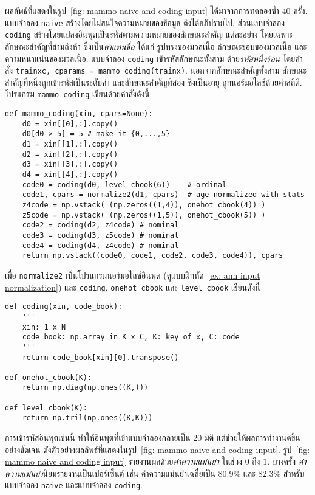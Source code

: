 \begin{Exercise}
ผลลัพธ์ที่แสดงในรูป~\ref{fig: mammo naive and coding input}
ได้มาจากการทดลองซ้ำ $40$ ครั้ง.
แบบจำลอง \verb|naive| สร้างโดยไม่สนใจความหมายของข้อมูล ดังได้อภิปรายไป.
ส่วนแบบจำลอง \verb|coding| สร้างโดยแปลงอินพุตเป็นรหัสตามความหมายของลักษณะสำคัญ
แต่ละอย่าง โดยเฉพาะลักษณะสำคัญที่สามถึงห้า ซึ่งเป็น\textit{ค่าแทนชื่อ}
ได้แก่ รูปทรงของมวลเนื้อ ลักษณะขอบของมวลเนื้อ และความหนาแน่นของมวลเนื้อ.
แบบจำลอง \verb|coding| เข้ารหัสลักษณะทั้งสาม ด้วย\textit{รหัสหนึ่งร้อน}
โดยคำสั่ง \verb|trainxc, cparams = mammo_coding(trainx)|.
นอกจากลักษณะสำคัญทั้งสาม
ลักษณะสำคัญที่หนึ่งถูกเข้ารหัสเป็นระดับค่า
และลักษณะสำคัญที่สอง ซึ่งเป็นอายุ
ถูกนอร์มอไลซ์ด้วยค่าสถิติ.
โปรแกรม \verb|mammo_coding| เขียนด้วยคำสั่งดังนี้
\begin{Verbatim}[fontsize=\small]
def mammo_coding(xin, cpars=None):
    d0 = xin[[0],:].copy()
    d0[d0 > 5] = 5 # make it {0,...,5}
    d1 = xin[[1],:].copy()
    d2 = xin[[2],:].copy()
    d3 = xin[[3],:].copy()
    d4 = xin[[4],:].copy()
    code0 = coding(d0, level_cbook(6))    # ordinal
    code1, cpars = normalize2(d1, cpars)  # age normalized with stats
    z4code = np.vstack( (np.zeros((1,4)), onehot_cbook(4)) )
    z5code = np.vstack( (np.zeros((1,5)), onehot_cbook(5)) )
    code2 = coding(d2, z4code) # nominal
    code3 = coding(d3, z5code) # nominal
    code4 = coding(d4, z4code) # nominal
    return np.vstack((code0, code1, code2, code3, code4)), cpars
\end{Verbatim}
เมื่อ \verb|normalize2| เป็นโปรแกรมนอร์มอไลซ์อินพุต (ดูแบบฝึกหัด~\ref{ex: ann input normalization})
และ \verb|coding|, \verb|onehot_cbook| และ \verb|level_cbook| เขียนดังนี้
\begin{Verbatim}[fontsize=\small]
def coding(xin, code_book):
    '''
    xin: 1 x N
    code_book: np.array in K x C, K: key of x, C: code
    '''
    return code_book[xin][0].transpose()
    
def onehot_cbook(K):
    return np.diag(np.ones((K,)))

def level_cbook(K):
    return np.tril(np.ones((K,K)))
\end{Verbatim}

การเข้ารหัสอินพุตเช่นนี้ ทำให้อินพุตที่เข้าแบบจำลองกลายเป็น $20$ มิติ
แต่ช่วยให้ผลการทำงานดีขึ้นอย่างชัดเจน 
ดังตัวอย่างผลลัพธ์ที่แสดงในรูป~\ref{fig: mammo naive and coding input}.
%
รูป~\ref{fig: mammo naive and coding input}
รายงานผลด้วย\textit{ค่าความแม่นยำ} ในช่วง $0$ ถึง $1$.
บางครั้ง \textit{ค่าความแม่นยำ}นิยมรายงานเป็นเปอร์เซ็นต์ เช่น
ค่าความแม่นยำเฉลี่ยเป็น $80.9\%$ และ $82.3\%$ สำหรับแบบจำลอง \verb|naive|
และแบบจำลอง \verb|coding|.


\end{Exercise}

